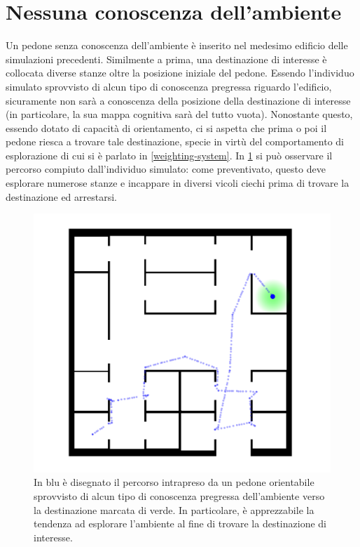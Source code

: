 \documentclass[12pt,a4paper,openright,oneside]{book}
\begin{document}
\section{Nessuna conoscenza dell'ambiente}
\label{no-knowledge-case-study}
Un pedone senza conoscenza dell'ambiente è inserito nel medesimo edificio delle simulazioni precedenti. Similmente a prima, una destinazione di interesse è collocata diverse stanze oltre la posizione iniziale del pedone. Essendo l'individuo simulato sprovvisto di alcun tipo di conoscenza pregressa riguardo l'edificio, sicuramente non sarà a conoscenza della posizione della destinazione di interesse (in particolare, la sua mappa cognitiva sarà del tutto vuota). Nonostante questo, essendo dotato di capacità di orientamento, ci si aspetta che prima o poi il pedone riesca a trovare tale destinazione, specie in virtù del comportamento di esplorazione di cui si è parlato in \ref{weighting-system}. In \cref{fig:no-knowledge} si può osservare il percorso compiuto dall'individuo simulato: come preventivato, questo deve esplorare numerose stanze e incappare in diversi vicoli ciechi prima di trovare la destinazione ed arrestarsi.
\begin{figure}
	\centering
	\includegraphics[width=0.7\linewidth]{figures/no-knowledge.png}
	\caption{In blu è disegnato il percorso intrapreso da un pedone orientabile sprovvisto di alcun tipo di conoscenza pregressa dell'ambiente verso la destinazione marcata di verde. In particolare, è apprezzabile la tendenza ad esplorare l'ambiente al fine di trovare la destinazione di interesse.}
	\label{fig:no-knowledge}
\end{figure}
\end{document}
